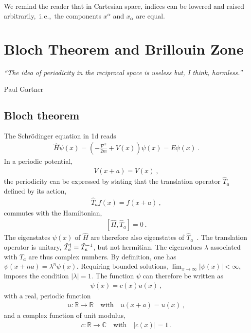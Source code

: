 We remind the reader that in Cartesian space, indices can be lowered and raised arbitrarily,~i.\,e.,~the components $x^\alpha$ and $x_\alpha$ are equal.

\chapter{Bloch Theorem and Brillouin Zone}
\epigraph{\singlespacing \it ``The idea of periodicity in the reciprocal space is useless but, I think, harmless.''}{Paul Gartner}
\section{Bloch theorem}
\label{sec:BlochTheorem}
The Schr\"odinger equation in 1d reads
\begin{align}
	\hat H \psi (x) = \left( - \frac{\nabla^2}{2m} + V(x) \right) \psi (x) = E \psi (x)~.
	\label{eq:app.bloch.se}
\end{align}
In a periodic potential,
\begin{align}
	V(x + a) = V(x)~,
	\label{eq:app.bloch.potential}
\end{align}
the periodicity can be expressed by stating that the translation operator $\hat T_a$ defined by its action,
\begin{align}
	\hat T_a f(x) = f(x + a)~,
	\label{eq:app.bloch.Ta}
\end{align}
commutes with the Hamiltonian,
\begin{align}
	\left[ \hat H , \hat T_a\right] = 0~.
	\label{eq:app.bloch.commute}
\end{align}
The eigenstates $\psi (x)$ of $\hat H$ are therefore also eigenstates of $\hat T_a$~\cite{Basdevant2000}. The translation operator is unitary, ${\hat T}^\dagger_a = \hat{T}_a^{-1}$, but not hermitian. The eigenvalues $\lambda$ associated with $\hat T_a$ are thus complex numbers. By definition, one has \mbox{$\psi ( x + na ) = \lambda^n \psi(x)$}. Requiring bounded solutions, $\lim_{x \rightarrow \infty} \lvert \psi (x) \rvert < \infty$, imposes the condition $\lvert \lambda \rvert = 1$.
The function $\psi$ can therefore be written as
\begin{align}
	\psi (x) = c(x) u(x)~,
\end{align}
with a real, periodic function
\begin{align}
	u: \mathds R \rightarrow \mathds R
	\quad\text{with}\quad u(x + a) = u(x)~,
\end{align}
and a complex function of unit modulus,
\begin{align}
	c: \mathds R \rightarrow \mathds C
	\quad\text{with}\quad \left\lvert c(x) \right\rvert = 1~.
	\label{eq:app.bloch.c1}
\end{align}
